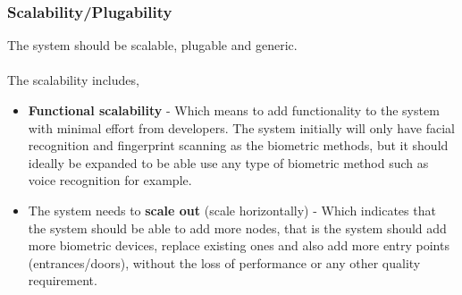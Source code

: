 \subsubsection{Scalability/Plugability}
The system should be scalable, plugable and generic.\\
\\The scalability includes,
\begin{itemize}
	\item  \textbf{Functional scalability} - Which means to add functionality to the system with minimal effort from developers.
		The system initially will only have facial recognition and fingerprint scanning as the biometric methods, but it should ideally be expanded to be able use any type of biometric method such as voice recognition for example.
	\item  The system needs to \textbf{scale out} (scale horizontally) - Which indicates that the system should be able to add more nodes, that is the system should add more biometric devices, replace existing ones and also add more entry points (entrances/doors), without the loss of performance or any other quality requirement.
\end{itemize}





